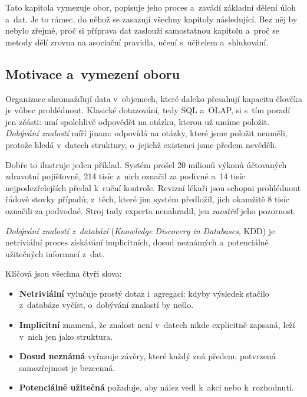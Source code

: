 \documentclass[11pt,a4paper]{article}
\theoremstyle{definition}
\begin{document}
Tato kapitola vymezuje obor, popisuje jeho proces a~zavádí základní dělení úloh a~dat.
Je to rámec, do něhož se zasazují všechny kapitoly následující. Bez něj by nebylo zřejmé,
proč si příprava dat zaslouží samostatnou kapitolu a~proč se metody dělí zrovna na
asociační pravidla, učení s~učitelem a~shlukování.

\subsection{Motivace a~vymezení oboru}

Organizace shromažďují data v~objemech, které daleko přesahují kapacitu člověka je vůbec
prohlédnout. Klasické dotazování, tedy SQL a~OLAP, si s~tím poradí jen zčásti: umí
spolehlivě odpovědět na otázku, kterou už umíme položit. \emph{Dobývání znalostí} míří
jinam: odpovídá na otázky, které jsme položit neuměli, protože hledá
v~datech struktury, o~jejichž existenci jsme předem nevěděli.

Dobře to ilustruje jeden příklad. Systém prošel 20 milionů výkonů účtovaných zdravotní
pojišťovně, 214 tisíc z~nich označil za podivné a~14 tisíc nejpodezřelejších předal
k~ruční kontrole. Revizní lékaři jsou schopni prohlédnout řádově stovky případů; z~těch,
které jim systém předložil, jich okamžitě 8 tisíc označili za podvodné. Stroj tady experta
nenahradil, jen \emph{zaostřil} jeho pozornost.

\begin{defbox}
\emph{Dobývání znalostí z~databází} (\emph{Knowledge Discovery in Databases}, KDD) je
netriviální proces získávání implicitních, dosud neznámých a~potenciálně užitečných
informací z~dat.

Klíčová jsou všechna čtyři slova:
\begin{itemize}
\item \textbf{Netriviální} vylučuje prostý dotaz i~agregaci: kdyby výsledek stačilo
      z~databáze vyčíst, o~dobývání znalostí by nešlo.
\item \textbf{Implicitní} znamená, že znalost není v~datech nikde explicitně zapsaná,
      leží v~nich jen jako struktura.
\item \textbf{Dosud neznámá} vyřazuje závěry, které každý zná předem; potvrzená
      samozřejmost je bezcenná.
\item \textbf{Potenciálně užitečná} požaduje, aby nález vedl k~akci nebo k~rozhodnutí.
\end{itemize}
\end{defbox}
\end{document}
